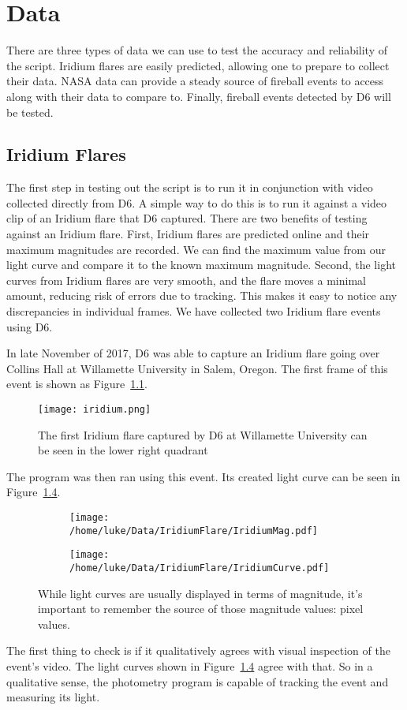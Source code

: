 \chapter{Data}

There are three types of data we can use to test the accuracy and reliability of the script. Iridium flares are easily predicted, allowing one to prepare to collect their data. NASA data can provide a steady source of fireball events to access along with their data to compare to. Finally, fireball events detected by D6 will be tested.

\section{Iridium Flares}

The first step in testing out the script is to run it in conjunction with video collected directly from D6. A simple way to do this is to run it against a video clip of an Iridium flare that D6 captured. There are two benefits of testing against an Iridium flare. First, Iridium flares are predicted online and their maximum magnitudes are recorded. We can find the maximum value from our light curve and compare it to the known maximum magnitude. Second, the light curves from Iridium flares are very smooth, and the flare moves a minimal amount, reducing risk of errors due to tracking. This makes it easy to notice any discrepancies in individual frames. We have collected two Iridium flare events using D6. 

In late November of 2017, D6 was able to capture an Iridium flare going over Collins Hall at Willamette University in Salem, Oregon. The first frame of this event is shown as Figure~\ref{fig:Iridium}.
\begin{figure}[h!]
	\centering
	\texttt{[image: iridium.png]}
	\caption{The first Iridium flare captured by D6 at Willamette University can be seen in the lower right quadrant}
	\label{fig:Iridium}
\end{figure}
The program was then ran using this event. Its created light curve can be seen in Figure~\ref{fig:IridiumCurves}.
\begin{figure}
\centering
\begin{subfigure}{.5\textwidth}
	\centering
	\texttt{[image: /home/luke/Data/IridiumFlare/IridiumMag.pdf]}
	\label{fig:Iridiummag}
\end{subfigure}%
\begin{subfigure}{.5\textwidth}
	\centering
	\texttt{[image: /home/luke/Data/IridiumFlare/IridiumCurve.pdf]}
	\label{fig:Iridiumcurve}
	\end{subfigure}
\caption{While light curves are usually displayed in terms of magnitude, it's important to remember the source of those magnitude values: pixel values.}
\label{fig:IridiumCurves}
\end{figure}
The first thing to check is if it qualitatively agrees with visual inspection of the event's video. The light curves shown in Figure~\ref{fig:IridiumCurves} agree with that. So in a qualitative sense, the photometry program is capable of tracking the event and measuring its light. 

